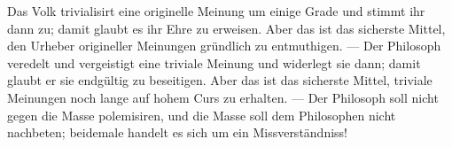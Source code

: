 Das Volk trivialisirt eine originelle Meinung um einige Grade und stimmt ihr dann zu; damit glaubt es ihr Ehre zu erweisen. Aber das ist das sicherste Mittel, den Urheber origineller Meinungen gründlich zu entmuthigen. — Der Philosoph veredelt und vergeistigt eine triviale Meinung und widerlegt sie dann; damit glaubt er sie endgültig zu beseitigen. Aber das ist das sicherste Mittel, triviale Meinungen noch lange auf hohem Curs zu erhalten. — Der Philosoph soll nicht gegen die Masse polemisiren, und die Masse soll dem Philosophen nicht nachbeten; beidemale handelt es sich um ein Missverständniss!
\par

